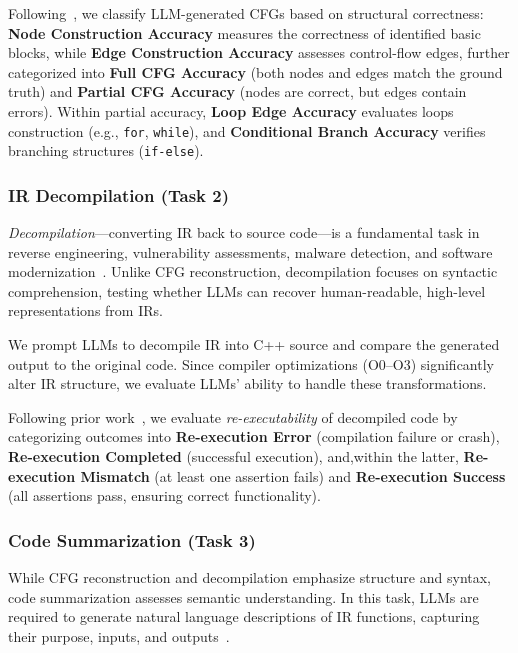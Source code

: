 Following~\cite{maunveiling}, we classify LLM-generated CFGs based on structural correctness:
\textbf{Node Construction Accuracy} measures the correctness of identified basic blocks, while \textbf{Edge Construction Accuracy} assesses control-flow edges, further categorized into \textbf{Full CFG Accuracy} (both nodes and edges match the ground truth) and \textbf{Partial CFG Accuracy} (nodes are correct, but edges contain errors). Within partial accuracy, \textbf{Loop Edge Accuracy} evaluates loops construction (e.g., \texttt{for}, \texttt{while}), and \textbf{Conditional Branch Accuracy} verifies branching structures (\texttt{if-else}). 

\subsubsection{IR Decompilation (Task 2)}
\label{subsec:decompilation_summarization}
\textit{Decompilation}—converting IR back to source code—is a fundamental task in reverse engineering, vulnerability assessments, malware detection, and software modernization~\cite{brumley2013native,jiang2023nova,hu2024degpt}.
Unlike CFG reconstruction, decompilation focuses on syntactic comprehension, testing whether LLMs can recover human-readable, high-level representations from IRs.

We prompt LLMs to decompile IR into C++ source and compare the generated output to the original code. Since compiler optimizations (O0–O3) significantly alter IR structure, we evaluate LLMs' ability to handle these transformations.

Following prior work~\cite{tan2024llm4decompile,armengol2024slade,wong2023refining}, we evaluate \emph{re-executability} of decompiled code by categorizing outcomes into \textbf{Re-execution Error} (compilation failure or crash), \textbf{Re-execution Completed} (successful execution), and,within the latter, \textbf{Re-execution Mismatch} (at least one assertion fails) and \textbf{Re-execution Success} (all assertions pass, ensuring correct functionality).

\subsubsection{Code Summarization (Task 3)}
\label{subsec:code_summarization}

While CFG reconstruction and decompilation emphasize structure and syntax, code summarization assesses semantic understanding. In this task, LLMs are required to generate natural language descriptions of IR functions, capturing their purpose, inputs, and outputs~\cite{codesummaryEvaluate,codesummarization2024}.

